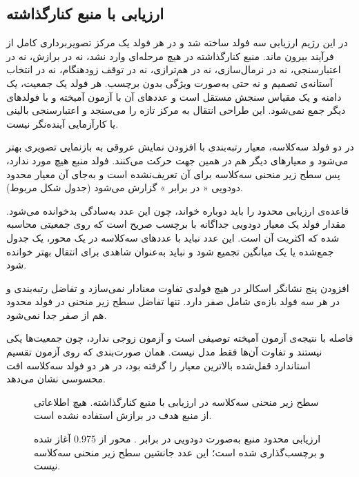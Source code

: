 \subsection{ارزیابی با منبع کنارگذاشته}



در این رژیم ارزیابی سه فولد ساخته شد و در هر فولد یک مرکز تصویربرداری کامل از فرآیند بیرون ماند. منبع کنارگذاشته در هیچ مرحله‌ای وارد نشد، نه در برازش، نه در اعتبارسنجی، نه در نرمال‌سازی، نه در هم‌ترازی، نه در توقف زودهنگام، نه در انتخاب آستانه‌ی تصمیم و نه حتی به‌صورت ویژگی بدون برچسب. هر فولد یک جمعیت، یک دامنه و یک مقیاس سنجش مستقل است و عددهای آن با آزمون آمیخته و با فولدهای دیگر جمع نمی‌شود. این طراحی انتقال به مرکز تازه را می‌سنجد و اعتبارسنجی بالینی یا کارآزمایی آینده‌نگر نیست.



در دو فولد سه‌کلاسه، معیار رتبه‌بندی با افزودن نمایش عروقی به بازنمایی تصویری بهتر می‌شود و معیارهای دیگر هم در همین جهت حرکت می‌کنند. فولد منبع  هیچ مورد  ندارد، پس سطح زیر منحنی سه‌کلاسه برای آن تعریف‌نشده است و به‌جای آن معیار محدود دودویی « در برابر » گزارش می‌شود (جدول شکل مربوط).

قاعده‌ی ارزیابی محدود را باید دوباره خواند، چون این عدد به‌سادگی بدخوانده می‌شود. مقدار فولد  یک معیار دودویی جداگانه با برچسب صریح است که روی جمعیتی محاسبه شده که اکثریت آن  است. این عدد نباید با عددهای سه‌کلاسه در یک محور، یک جدول جمع‌شده یا یک میانگین تجمیع شود و نباید به‌عنوان شاهدی برای انتقال بهتر خوانده شود.

افزودن پنج نشانگر اسکالر در هیچ فولدی تفاوت معنادار نمی‌سازد و تفاضل رتبه‌بندی  و  در هر سه فولد بازه‌ی شامل صفر دارد. تنها تفاضل سطح زیر منحنی در فولد محدود  هم از صفر جدا نمی‌شود.

فاصله با نتیجه‌ی آزمون آمیخته توصیفی است و آزمون زوجی ندارد، چون جمعیت‌ها یکی نیستند و تفاوت آن‌ها فقط مدل نیست. همان صورت‌بندی  که روی آزمون تقسیم استاندارد قفل‌شده بالاترین معیار را گرفته بود، در هر دو فولد سه‌کلاسه افت محسوسی نشان می‌دهد.

\begin{figure}[htbp]
  \centering
  \caption{سطح زیر منحنی سه‌کلاسه در ارزیابی با منبع کنارگذاشته. هیچ اطلاعاتی از منبع هدف در برازش استفاده نشده است.}
  \label{fig:U48}
\end{figure}

\begin{figure}[htbp]
  \centering
  \caption{ارزیابی محدود منبع  به‌صورت دودویی  در برابر . محور از 0.975 آغاز شده و برچسب‌گذاری شده است؛ این عدد جانشین سطح زیر منحنی سه‌کلاسه نیست.}
  \label{fig:U49}
\end{figure}

